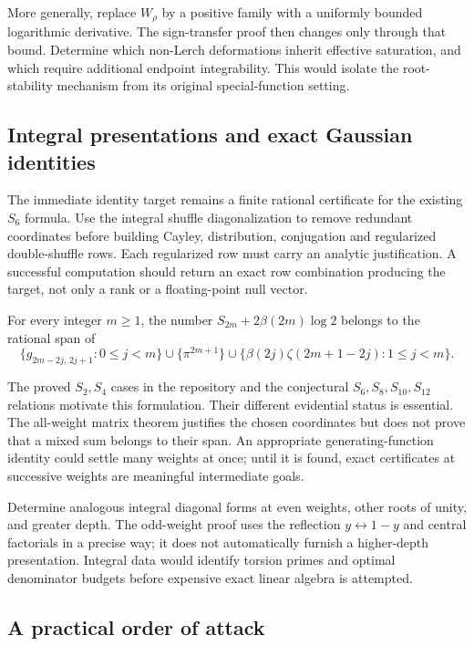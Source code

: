 More generally, replace $W_\rho$ by a positive family with a uniformly
bounded logarithmic derivative. The sign-transfer proof then changes
only through that bound. Determine which non-Lerch deformations inherit
effective saturation, and which require additional endpoint integrability.
This would isolate the root-stability mechanism from its original
special-function setting.

\subsection{Integral presentations and exact Gaussian identities}

The immediate identity target remains a finite rational certificate for
the existing $S_6$ formula. Use the integral shuffle diagonalization to
remove redundant coordinates before building Cayley, distribution,
conjugation and regularized double-shuffle rows. Each regularized row
must carry an analytic justification. A successful computation should
return an exact row combination producing the target, not only a rank
or a floating-point null vector.

\begin{conjecture}
\label{conj:uniform-span}
For every integer $m\ge1$, the number
$S_{2m}+2\beta(2m)\log2$ belongs to the rational span of
\[
 \{g_{2m-2j,\,2j+1}:0\le j<m\}
 \cup\{\pi^{2m+1}\}
 \cup\{\beta(2j)\zeta(2m+1-2j):1\le j<m\}.
\]
\end{conjecture}

The proved $S_2,S_4$ cases in the repository and the conjectural
$S_6,S_8,S_{10},S_{12}$ relations motivate this formulation. Their
different evidential status is essential. The all-weight matrix theorem
justifies the chosen coordinates but does not prove that a mixed sum
belongs to their span. An appropriate generating-function identity could
settle many weights at once; until it is found, exact certificates at
successive weights are meaningful intermediate goals.

Determine analogous integral diagonal forms at even weights, other roots
of unity, and greater depth. The odd-weight proof uses the reflection
$y\leftrightarrow1-y$ and central factorials in a precise way; it does
not automatically furnish a higher-depth presentation. Integral data
would identify torsion primes and optimal denominator budgets before
expensive exact linear algebra is attempted.

\subsection{A practical order of attack}

